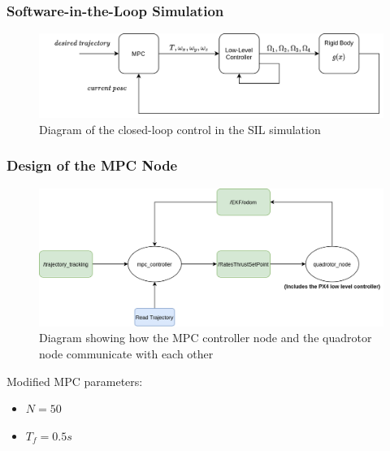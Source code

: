 \documentclass{thesisbeamer}
\newcommand\Fontvi{\fontsize{9}{10}\selectfont}
\begin{document}
		
		\begin{frame}
		\frametitle{Software-in-the-Loop Simulation}
		
			\begin{figure}
				\centering
				\includegraphics[width=\textwidth]{diagrams/new_sim_diagram.png}
				\caption{Diagram of the closed-loop control in the SIL simulation}
			\end{figure}
			
		\end{frame}
		
		
\begin{frame}
	\frametitle{Design of the MPC Node}
	\Fontvi
	
	\begin{figure}
		\centering
		\includegraphics[width=\textwidth]{diagrams/ros_graph.png}
		\caption{Diagram showing how the MPC controller node and the quadrotor node communicate with each other}
	\end{figure}

	Modified MPC parameters:
	\begin{itemize}
		\item $N = 50$
		\item $T_f = 0.5s$
	\end{itemize}		
	
\end{frame}
		
\end{document}
